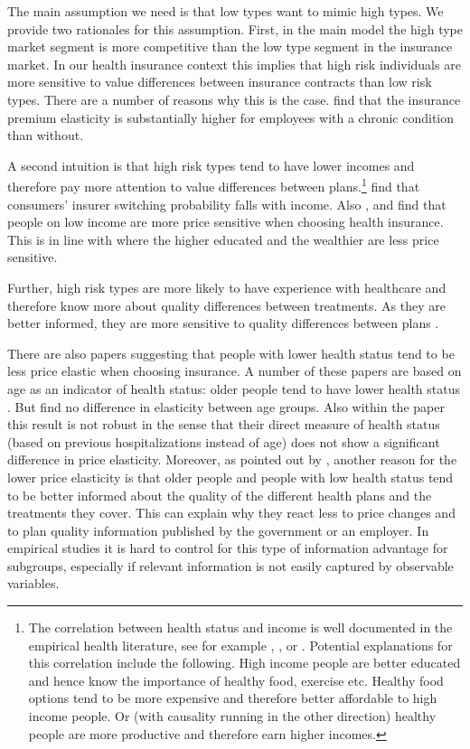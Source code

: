 \documentclass[12pt,english,a4paper]{article}
\begin{document}
The main assumption we need is that low types want to mimic high types. We provide two rationales for this assumption. First, in the main model the high type market segment is more competitive than the low type segment in the insurance market. In our health insurance context this implies that high risk individuals are more sensitive to value differences between insurance contracts than low risk types. There are a number of reasons why this is the case. \cite{Parente2004} find that the insurance premium elasticity is substantially higher for employees with a chronic condition than without. 

A second intuition is that high risk types tend to have lower incomes and therefore pay more attention to value differences between plans.\footnote{The correlation between health status and income is well documented in the empirical health literature, see for example \cite{fri05}, \cite{fin06}, \cite{gra09} or \cite{mun10}. Potential explanations for this correlation include the following. High income people are better educated and hence know the importance of healthy food, exercise etc. Healthy food options tend to be more expensive and therefore better affordable to high income people. Or (with causality running in the other direction) healthy people are more productive and therefore earn higher incomes.} \cite{hogan2017} find that consumers' insurer switching probability falls with income. Also \cite{Atherly2004}, \cite{Auerbach2006} and \cite{SALTZMAN2019197} find that people on low income are more price sensitive when choosing health insurance. This is in line with \cite{Royalty99} where the higher educated and the wealthier are less price sensitive.

Further, high risk types are more likely to have experience with healthcare and therefore know more about quality differences between treatments. As they are better informed, they are more sensitive to quality differences between plans \citep{NBERw19800}.

There are also papers suggesting that people with lower health status tend to be less price elastic when choosing insurance. A number of these papers are based on age as an indicator of health status: older people tend to have lower health status \citep{STROMBOM200289,Royalty99}. But \cite{Costa_2003} find no difference in elasticity between age groups. Also within the \cite{STROMBOM200289} paper this result is not robust in the sense that their direct measure of health status (based on previous hospitalizations instead of age) does not show a significant difference in price elasticity. Moreover, as pointed out by \cite{BEAULIEU200243}, another reason for the lower price elasticity is that older people and people with low health status tend to be better informed about the quality of the different health plans and the treatments they cover. This can explain why they react less to price changes and to plan quality information published by the government or an employer. In empirical studies it is hard to control for this type of information advantage for subgroups, especially if relevant information is not easily captured by observable variables.
\end{document}
